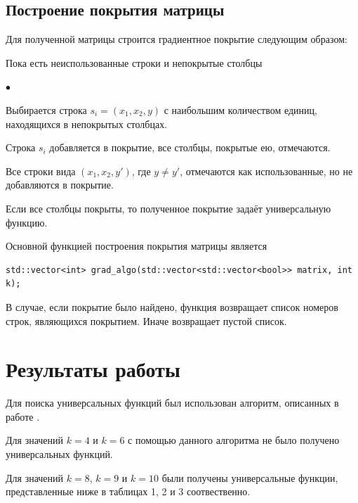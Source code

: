 \documentclass[oneside,final,14pt]{extreport}
\newenvironment{compactlist}{
    \begin{list}{{$\bullet$}}{
      \setlength\partopsep{0pt}
      \setlength\parskip{0pt}
      \setlength\parsep{0pt}
      \setlength\topsep{0pt}
      \setlength\itemsep{0pt}
} }{

 \end{list} 
}
\begin{document}
\section*{Построение покрытия матрицы}

Для полученной матрицы строится градиентное покрытие следующим образом:
\begin{enumerate}
\item Пока есть неиспользованные строки и непокрытые столбцы
\begin{compactlist}
\item Выбирается строка \(s_i = (x_1, x_2, y)\) с наибольшим количеством единиц, находящихся в непокрытых столбцах.
\item Строка \(s_i\) добавляется в покрытие, все столбцы, покрытые ею, отмечаются.
\item Все строки вида \((x_1, x_2, y')\), где \(y \neq y'\), отмечаются как использованные, но не добавляются в покрытие.
\end{compactlist}
\item Если все столбцы покрыты, то полученное покрытие задаёт универсальную функцию.
\end{enumerate}

Основной функцией построения покрытия матрицы является

\begin{lstlisting}
std::vector<int> grad_algo(std::vector<std::vector<bool>> matrix, int k);
\end{lstlisting}

В случае, если покрытие было найдено, функция возвращает список номеров строк, являющихся покрытием. 
Иначе возвращает пустой список.

\section*{}

\chapter*{Результаты работы}

Для поиска универсальных функций был использован алгоритм, описанных в работе \cite{}.

Для значений \(k = 4\) и \(k = 6\) с помощью данного алгоритма не было получено универсальных функций.

Для значений \(k = 8\), \(k = 9\) и \(k = 10\) были получены универсальные функции, представленные ниже 
в таблицах 1, 2 и 3 соотвественно.
\end{document}
